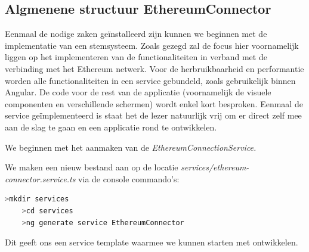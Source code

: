 	\subsection{Algmenene structuur EthereumConnector}
	Eenmaal de nodige zaken geïnstalleerd zijn kunnen we beginnen met de implementatie van een stemsysteem. Zoals gezegd zal de focus hier voornamelijk liggen op het implementeren van de functionaliteiten in verband met  de verbinding met het Ethereum netwerk. Voor de herbruikbaarheid en performantie worden alle functionaliteiten in een service gebundeld,  zoals gebruikelijk binnen Angular. De code voor de rest van de applicatie (voornamelijk de visuele componenten en verschillende schermen) wordt enkel kort besproken.  Eenmaal de service geïmplementeerd is staat het de lezer natuurlijk vrij om er direct zelf mee aan de slag te gaan en een applicatie rond te ontwikkelen.
	
	 We beginnen met het aanmaken van de \textit{EthereumConnectionService.} 
	
	We maken een nieuw bestand aan op de locatie \textit{services/ethereum-connector.service.ts} via de console commando's:
	\begin{lstlisting}[numbers=none,language=bash]
	>mkdir services
	>cd services
	>ng generate service EthereumConnector
	\end{lstlisting}
	
	Dit geeft ons een service template waarmee we kunnen starten met ontwikkelen.
	
